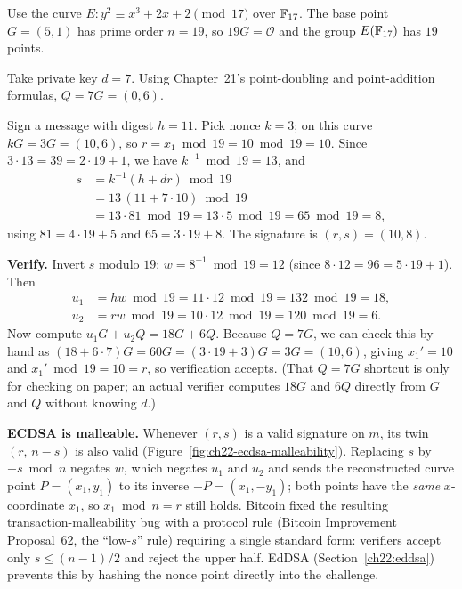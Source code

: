 \begin{example}
\label{ch22:ex-ecdsa}
Use the curve $E: y^2 \equiv x^3 + 2x + 2 \pmod{17}$ over $\mathbb{F}_{17}$. The base point $G = (5, 1)$ has prime order $n = 19$, so $19 G = \mathcal{O}$ and the group $E(\mathbb{F}_{17})$ has $19$ points.

Take private key $d = 7$. Using Chapter~21's point-doubling and point-addition formulas, $Q = 7G = (0, 6)$.

Sign a message with digest $h = 11$. Pick nonce $k = 3$; on this curve $kG = 3G = (10, 6)$, so $r = x_1 \bmod 19 = 10 \bmod 19 = 10$. Since $3\cdot 13 = 39 = 2\cdot 19 + 1$, we have $k^{-1} \bmod 19 = 13$, and
\begin{align*}
  s &= k^{-1}(h + d r)\bmod 19 \\
    &= 13\,(11 + 7\cdot 10)\bmod 19 \\
    &= 13\cdot 81 \bmod 19 = 13\cdot 5 \bmod 19 = 65 \bmod 19 = 8,
\end{align*}
using $81 = 4\cdot 19 + 5$ and $65 = 3\cdot 19 + 8$. The signature is $(r, s) = (10, 8)$.

\textbf{Verify.} Invert $s$ modulo $19$: $w = 8^{-1}\bmod 19 = 12$ (since $8\cdot 12 = 96 = 5\cdot 19 + 1$). Then
\begin{align*}
  u_1 &= h w \bmod 19 = 11\cdot 12 \bmod 19 = 132 \bmod 19 = 18, \\
  u_2 &= r w \bmod 19 = 10\cdot 12 \bmod 19 = 120 \bmod 19 = 6.
\end{align*}
Now compute $u_1 G + u_2 Q = 18G + 6Q$. Because $Q = 7G$, we can check this by hand as $(18 + 6\cdot 7)G = 60G = (3\cdot 19 + 3)G = 3G = (10, 6)$, giving $x_1' = 10$ and $x_1' \bmod 19 = 10 = r$, so verification accepts. (That $Q = 7G$ shortcut is only for checking on paper; an actual verifier computes $18G$ and $6Q$ directly from $G$ and $Q$ without knowing $d$.)
\end{example}

\begin{trapbox}
\textbf{ECDSA is malleable.} Whenever $(r, s)$ is a valid signature on $m$, its twin $(r,\, n - s)$ is also valid (Figure~\ref{fig:ch22-ecdsa-malleability}). Replacing $s$ by $-s \bmod n$ negates $w$, which negates $u_1$ and $u_2$ and sends the reconstructed curve point $P = (x_1, y_1)$ to its inverse $-P = (x_1, -y_1)$; both points have the \emph{same} $x$-coordinate $x_1$, so $x_1 \bmod n = r$ still holds. Bitcoin fixed the resulting transaction-malleability bug with a protocol rule (Bitcoin Improvement Proposal~62, the ``low-$s$'' rule) requiring a single standard form: verifiers accept only $s \le (n-1)/2$ and reject the upper half. EdDSA (Section~\ref{ch22:eddsa}) prevents this by hashing the nonce point directly into the challenge.
\end{trapbox}

